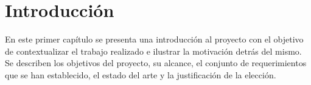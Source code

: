 \chapter{Introducción}
\label{chap:intro}

En este primer capítulo se presenta una introducción al proyecto con el objetivo de contextualizar el trabajo realizado e ilustrar la motivación detrás del mismo. Se describen los objetivos del proyecto, su alcance, el conjunto de requerimientos que se han establecido, el estado del arte y la justificación de la elección.









